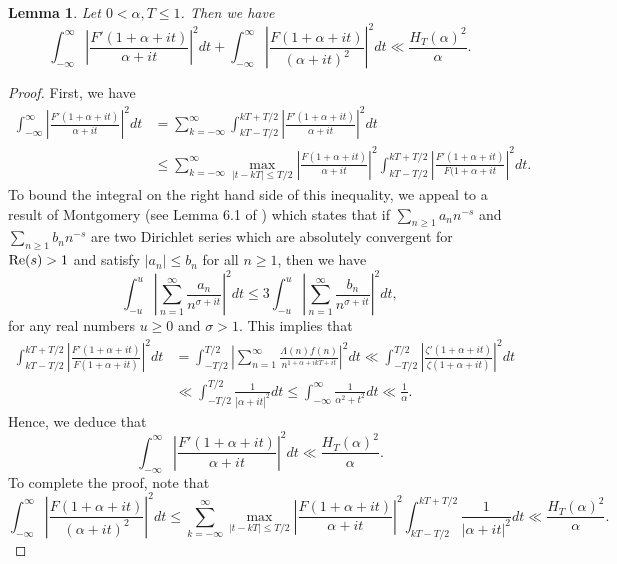 \documentclass[12pt]{amsart}
\newtheorem{lem}[thm]{Lemma}
\theoremstyle{definition}
\numberwithin{equation}{section}
\newcommand{\re}{\textup{Re}}
\begin{document}
\begin{lem}\label{MVModification}
Let $0<\alpha, T\leq 1$. Then we have
\begin{equation}\label{TheModificationMV}
\int_{-\infty}^{\infty}\left|\frac{F'(1+\alpha+it)}{\alpha+it}\right|^2 dt+ \int_{-\infty}^{\infty}\left|\frac{F(1+\alpha+it)}{(\alpha+it)^2}\right|^2 dt \ll \frac{H_{T}(\alpha)^2}{\alpha}.
\end{equation}
\end{lem}
\begin{proof}
First, we have
\begin{align*}
\int_{-\infty}^{\infty}\left|\frac{F'(1+\alpha+it)}{\alpha+it}\right|^2 dt
&=\sum_{k=-\infty}^{\infty}\int_{kT-T/2}^{kT+T/2}\left|\frac{F'(1+\alpha+it)}{\alpha+it}\right|^2dt\\
&\leq \sum_{k=-\infty}^{\infty}\max_{|t-kT|\leq T/2}\left|\frac{F(1+\alpha+it)}{\alpha+it}\right|^2 \int_{kT-T/2}^{kT+T/2}\left|\frac{F'(1+\alpha+it)}{F(1+\alpha+it}\right|^2dt.
\end{align*}
To bound the integral on the right hand side of this inequality, we appeal to a result of Montgomery (see Lemma 6.1 of \cite{Te}) which states that if $\sum_{n\geq 1}a_n n^{-s}$ and $\sum_{n\geq 1}b_n n^{-s}$ are two Dirichlet series which are absolutely convergent for $\re(s)>1$ and satisfy $|a_n|\leq b_n$ for all $n\geq 1$, then we have 
\begin{equation}\label{MontgomeryInequality}
\int_{-u}^{u}\left|\sum_{n=1}^{\infty}\frac{a_n}{n^{\sigma+it}}\right|^2dt \leq 3 \int_{-u}^{u}\left|\sum_{n=1}^{\infty}\frac{b_n}{n^{\sigma+it}}\right|^2 dt,
\end{equation}
for any real numbers $u\geq 0$ and $\sigma>1$. This implies that
\begin{align*}
\int_{kT-T/2}^{kT+T/2}\left|\frac{F'(1+\alpha+it)}{F(1+\alpha+it)}\right|^2dt 
&=\int_{-T/2}^{T/2} \left| \sum_{n=1}^{\infty} \frac{\Lambda(n) f(n)}{n^{1+\alpha+ikT+it}}\right|^2dt 
\ll \int_{-T/2}^{T/2} \left|\frac{\zeta'(1+\alpha+it)}{\zeta(1+\alpha+it)}\right|^2 dt\\
& 
\ll \int_{-T/2}^{T/2} \frac{1}{|\alpha+it|^2}dt\leq \int_{-\infty}^{\infty} \frac{1}{\alpha^2+t^2}dt \ll \frac{1}{\alpha}.
\end{align*}
Hence, we deduce that 
$$ \int_{-\infty}^{\infty}\left|\frac{F'(1+\alpha+it)}{\alpha+it}\right|^2 dt \ll \frac{H_{T}(\alpha)^2}{\alpha}.$$
To complete the proof, note that
$$\int_{-\infty}^{\infty}\left|\frac{F(1+\alpha+it)}{(\alpha+it)^2}\right|^2 dt \leq \sum_{k=-\infty}^{\infty}\max_{|t-kT|\leq T/2}\left|\frac{F(1+\alpha+it)}{\alpha+it}\right|^2 \int_{kT-T/2}^{kT+T/2}\frac{1}{|\alpha+it|^2}dt \ll \frac{H_{T}(\alpha)^2}{\alpha}.$$
\end{proof}
\end{document}
